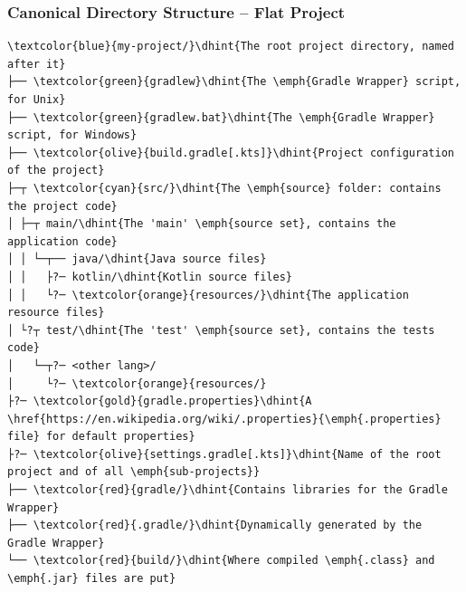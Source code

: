 \documentclass[presentation]{beamer}\mode<presentation>{\usetheme{AMSBolognaFC}}
\begin{document}
\begin{frame}[fragile]
\frametitle{Canonical Directory Structure -- Flat Project}

\begin{Verbatim}[fontsize=\small,commandchars=\\\{\}]
\textcolor{blue}{my-project/}\dhint{The root project directory, named after it}
├── \textcolor{green}{gradlew}\dhint{The \emph{Gradle Wrapper} script, for Unix}
├── \textcolor{green}{gradlew.bat}\dhint{The \emph{Gradle Wrapper} script, for Windows}
├── \textcolor{olive}{build.gradle[.kts]}\dhint{Project configuration of the project}
├─┬ \textcolor{cyan}{src/}\dhint{The \emph{source} folder: contains the project code}
│ ├─┬ main/\dhint{The 'main' \emph{source set}, contains the application code}
│ │ └─┬── java/\dhint{Java source files}
│ │   ├?─ kotlin/\dhint{Kotlin source files}
│ │   └?─ \textcolor{orange}{resources/}\dhint{The application resource files}
│ └?┬ test/\dhint{The 'test' \emph{source set}, contains the tests code}
│   └─┬?─ <other lang>/
│     └?─ \textcolor{orange}{resources/}
├?─ \textcolor{gold}{gradle.properties}\dhint{A \href{https://en.wikipedia.org/wiki/.properties}{\emph{.properties} file} for default properties}
├?─ \textcolor{olive}{settings.gradle[.kts]}\dhint{Name of the root project and of all \emph{sub-projects}}
├── \textcolor{red}{gradle/}\dhint{Contains libraries for the Gradle Wrapper}
├── \textcolor{red}{.gradle/}\dhint{Dynamically generated by the Gradle Wrapper}
└── \textcolor{red}{build/}\dhint{Where compiled \emph{.class} and \emph{.jar} files are put}
\end{Verbatim}

\end{frame}
\end{document}
